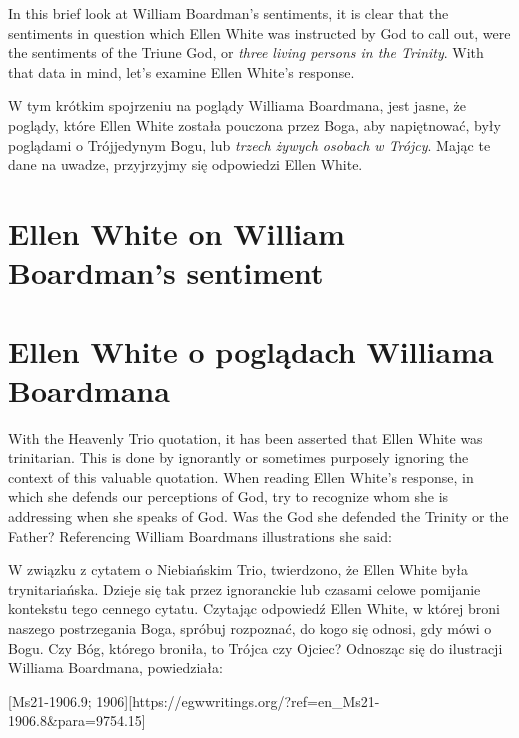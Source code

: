 In this brief look at William Boardman's sentiments, it is clear that the sentiments in question which Ellen White was instructed by God to call out, were the sentiments of the Triune God, or \textit{three living persons in the Trinity}. With that data in mind, let's examine Ellen White's response.


W tym krótkim spojrzeniu na poglądy Williama Boardmana, jest jasne, że poglądy, które Ellen White została pouczona przez Boga, aby napiętnować, były poglądami o Trójjedynym Bogu, lub \textit{trzech żywych osobach w Trójcy}. Mając te dane na uwadze, przyjrzyjmy się odpowiedzi Ellen White.


\section*{Ellen White on William Boardman’s sentiment}


\section*{Ellen White o poglądach Williama Boardmana}


With the Heavenly Trio quotation, it has been asserted that Ellen White was trinitarian. This is done by ignorantly or sometimes purposely ignoring the context of this valuable quotation. When reading Ellen White’s response, in which she defends our perceptions of God, try to recognize whom she is addressing when she speaks of God. Was the God she defended the Trinity or the Father? Referencing William Boardmans illustrations she said:


W związku z cytatem o Niebiańskim Trio, twierdzono, że Ellen White była trynitariańska. Dzieje się tak przez ignoranckie lub czasami celowe pomijanie kontekstu tego cennego cytatu. Czytając odpowiedź Ellen White, w której broni naszego postrzegania Boga, spróbuj rozpoznać, do kogo się odnosi, gdy mówi o Bogu. Czy Bóg, którego broniła, to Trójca czy Ojciec? Odnosząc się do ilustracji Williama Boardmana, powiedziała:


[Ms21-1906.9; 1906][https://egwwritings.org/?ref=en\_Ms21-1906.8&para=9754.15]


